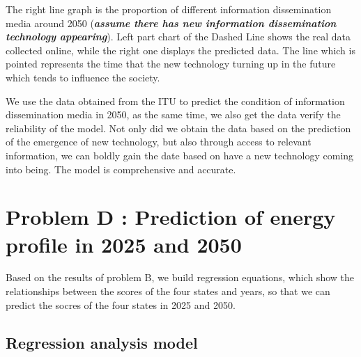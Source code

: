 \documentclass[a4paper,11pt]{article}
\begin{document}
\par The right line graph is the proportion of different information dissemination media around 2050 (\textbf{\emph{assume there has new information dissemination technology appearing}}). Left part chart of the Dashed Line shows the real data collected online, while the right one displays the predicted data. The line which is pointed represents the time that the new technology turning up in the future which tends to influence the society.

\par We use the data obtained from the ITU to predict the condition of information dissemination media in 2050, as the same time, we also get the data verify the reliability of the model. Not only did we obtain the data based on the prediction of the emergence of new technology, but also through access to relevant information, we can boldly gain the date based on have a new technology coming into being. The model is comprehensive and accurate.









\section{Problem D : Prediction of energy profile in 2025 and 2050}
\par Based on the results of problem B, we build regression equations, which show the relationships between the scores of the four states and years, so that we can predict the socres of the four states in 2025 and 2050.
\subsection{Regression analysis model}  
\end{document}
